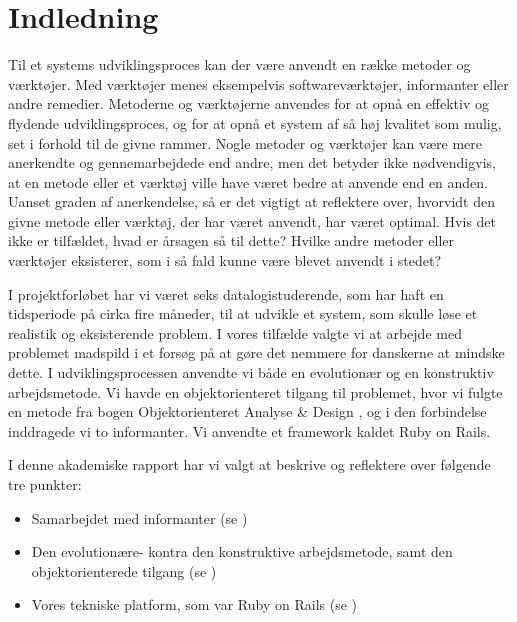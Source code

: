 \chapter{Indledning}

Til et systems udviklingsproces kan der være anvendt en række metoder og værktøjer. Med værktøjer menes eksempelvis softwareværktøjer, informanter eller andre remedier. Metoderne og værktøjerne anvendes for at opnå en effektiv og flydende udviklingsproces, og for at opnå et system af så høj kvalitet som mulig, set i forhold til de givne rammer. Nogle metoder og værktøjer kan være mere anerkendte og gennemarbejdede end andre, men det betyder ikke nødvendigvis, at en metode eller et værktøj ville have været bedre at anvende end en anden. Uanset graden af anerkendelse, så er det vigtigt at reflektere over, hvorvidt den givne metode eller værktøj, der har været anvendt, har været optimal. Hvis det ikke er tilfældet, hvad er årsagen så til dette? Hvilke andre metoder eller værktøjer eksisterer, som i så fald kunne være blevet anvendt i stedet?

I projektforløbet har vi været seks datalogistuderende, som har haft en tidsperiode på cirka fire måneder, til at udvikle et system, som skulle løse et realistik og eksisterende problem. I vores tilfælde valgte vi at arbejde med problemet madspild i et forsøg på at gøre det nemmere for danskerne at mindske dette. I udviklingsprocessen anvendte vi både en evolutionær og en konstruktiv arbejdsmetode. Vi havde en objektorienteret tilgang til problemet, hvor vi fulgte en metode fra bogen Objektorienteret Analyse \& Design \cite{ooad}, og i den forbindelse inddragede vi to informanter. Vi anvendte et framework kaldet Ruby on Rails. 

I denne akademiske rapport har vi valgt at beskrive og reflektere over følgende tre punkter:

\begin{itemize}[noitemsep]
  \item Samarbejdet med informanter (se )
  \item Den evolutionære- kontra den konstruktive arbejdsmetode, samt den objektorienterede tilgang (se )
  \item Vores tekniske platform, som var Ruby on Rails (se )
\end{itemize}

